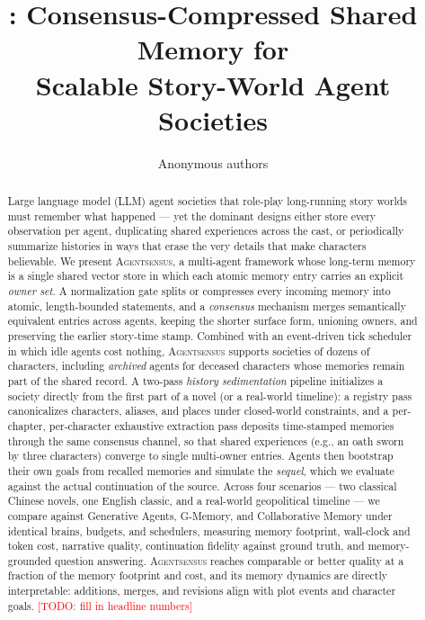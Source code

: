 \documentclass[11pt]{article}
\title{\sysname: Consensus-Compressed Shared Memory for\\ Scalable Story-World Agent Societies}
\author{Anonymous authors}}
\date{}
\newcommand{\sysname}{\textsc{Agentsensus}}
\newcommand{\todo}[1]{\textcolor{red}{[TODO: #1]}}
\begin{document}
\maketitle

\begin{abstract}
Large language model (LLM) agent societies that role-play long-running story worlds
must remember what happened --- yet the dominant designs either store every
observation per agent, duplicating shared experiences across the cast, or
periodically summarize histories in ways that erase the very details that make
characters believable. We present \sysname, a multi-agent framework whose
long-term memory is a single shared vector store in which each atomic memory
entry carries an explicit \emph{owner set}. A normalization gate splits or
compresses every incoming memory into atomic, length-bounded statements, and a
\emph{consensus} mechanism merges semantically equivalent entries across agents,
keeping the shorter surface form, unioning owners, and preserving the earlier
story-time stamp. Combined with an event-driven tick scheduler in which idle
agents cost nothing, \sysname{} supports societies of dozens of characters,
including \emph{archived} agents for deceased characters whose memories remain
part of the shared record. A two-pass \emph{history sedimentation} pipeline
initializes a society directly from the first part of a novel (or a real-world
timeline): a registry pass canonicalizes characters, aliases, and places under
closed-world constraints, and a per-chapter, per-character exhaustive extraction
pass deposits time-stamped memories through the same consensus channel, so that
shared experiences (e.g., an oath sworn by three characters) converge to single
multi-owner entries. Agents then bootstrap their own goals from recalled
memories and simulate the \emph{sequel}, which we evaluate against the actual
continuation of the source. Across four scenarios --- two classical Chinese
novels, one English classic, and a real-world geopolitical timeline --- we
compare against Generative Agents, G-Memory, and Collaborative Memory under
identical brains, budgets, and schedulers, measuring memory footprint,
wall-clock and
token cost, narrative quality, continuation fidelity against ground truth, and
memory-grounded question answering. \sysname{} reaches comparable or better
quality at a fraction of the memory footprint and cost, and its memory dynamics
are directly interpretable: additions, merges, and revisions align with plot
events and character goals. \todo{fill in headline numbers}
\end{abstract}
\end{document}
